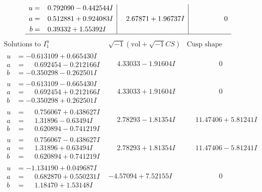\documentclass[1p]{elsarticle_modified}
\theoremstyle{definition}
\newcommand{\I}{\sqrt{-1}}
\begin{document}
$$\begin{array}{c|c|c}
\begin{aligned}
u &= \phantom{-}0.792090 - 0.442544 I \\
a &= \phantom{-}0.512881 + 0.924083 I \\
b &= \phantom{-}0.39332 + 1.55392 I\end{aligned}
 & \phantom{-}2.67871 + 1.96737 I & \phantom{-0.000000 } 0\\
 \hline 
 \end{array}$$\newpage$$\begin{array}{c|c|c}  
\text{Solutions to }I^u_{1}& \I (\text{vol} + \sqrt{-1}CS) & \text{Cusp shape}\\
 \hline 
\begin{aligned}
u &= -0.613109 + 0.665430 I \\
a &= \phantom{-}0.692454 - 0.212166 I \\
b &= -0.350298 - 0.262501 I\end{aligned}
 & \phantom{-}4.33033 - 1.91604 I & \phantom{-0.000000 } 0 \\ \hline\begin{aligned}
u &= -0.613109 - 0.665430 I \\
a &= \phantom{-}0.692454 + 0.212166 I \\
b &= -0.350298 + 0.262501 I\end{aligned}
 & \phantom{-}4.33033 + 1.91604 I & \phantom{-0.000000 } 0 \\ \hline\begin{aligned}
u &= \phantom{-}0.756067 + 0.438627 I \\
a &= \phantom{-}1.31896 - 0.63494 I \\
b &= \phantom{-}0.620894 - 0.741219 I\end{aligned}
 & \phantom{-}2.78293 - 1.81354 I & \phantom{-}11.47406 + 5.81241 I \\ \hline\begin{aligned}
u &= \phantom{-}0.756067 - 0.438627 I \\
a &= \phantom{-}1.31896 + 0.63494 I \\
b &= \phantom{-}0.620894 + 0.741219 I\end{aligned}
 & \phantom{-}2.78293 + 1.81354 I & \phantom{-}11.47406 - 5.81241 I \\ \hline\begin{aligned}
u &= -1.134190 + 0.049687 I \\
a &= \phantom{-}0.682870 + 0.550231 I \\
b &= \phantom{-}1.18470 + 1.53148 I\end{aligned}
 & -4.57094 + 7.52155 I & \phantom{-0.000000 } 0 \\ \hline\begin{aligned}

\end{aligned}
\end{array}$$
\end{document}
